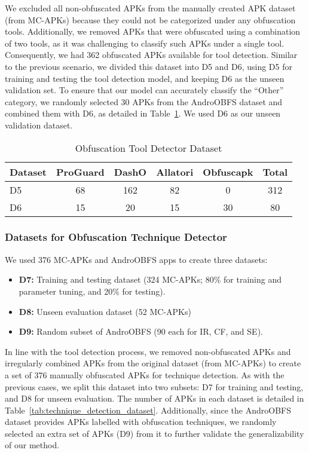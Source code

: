 We excluded all non-obfuscated APKs from the manually created APK dataset (from MC-APKs) because they could not be categorized under any obfuscation tools. Additionally, we removed APKs that were obfuscated using a combination of two tools, as it was challenging to classify such APKs under a single tool. Consequently, we had 362 obfuscated APKs available for tool detection. Similar to the previous scenario, we divided this dataset into D5 and D6, using D5 for training and testing the tool detection model, and keeping D6 as the unseen validation set. To ensure that our model can accurately classify the ``Other'' category, we randomly selected 30 APKs from the AndroOBFS dataset and combined them with D6, as detailed in Table~\ref{tab:tool_detection_dataset}. We used D6 as our unseen validation dataset.

\begin{table}[!h] 
    \caption{Obfuscation Tool Detector Dataset}
    \label{tab:tool_detection_dataset}
    \begin{tabular}{p{1.5cm}ccccc} \hline
        Dataset & ProGuard & DashO & Allatori & Obfuscapk & Total\\ \hline
        D5 & 68 & 162 & 82 & 0 & 312\\
        D6 & 15& 20 & 15& 30& 80\\
        \hline
    \end{tabular}
\end{table}

\subsubsection{Datasets for Obfuscation Technique Detector}

We used 376 MC-APKs and AndroOBFS apps to create three datasets:
\begin{itemize}
    \item {\bf D7:} Training and testing dataset (324 MC-APKs; 80\% for training and parameter tuning, and 20\% for testing).
    \item {\bf D8:} Unseen evaluation dataset (52 MC-APKs)
    \item {\bf D9:} Random subset of AndroOBFS (90 each for IR, CF, and SE).
\end{itemize}
In line with the tool detection process, we removed non-obfuscated APKs and irregularly combined APKs from the original dataset (from MC-APKs) to create a set of 376 manually obfuscated APKs for technique detection. As with the previous cases, we split this dataset into two subsets: D7 for training and testing, and D8 for unseen evaluation. The number of APKs in each dataset is detailed in Table~\ref{tab:technique_detection_dataset}. Additionally, since the AndroOBFS dataset provides APKs labelled with obfuscation techniques, we randomly selected an extra set of APKs (D9) from it to further validate the generalizability of our method.

